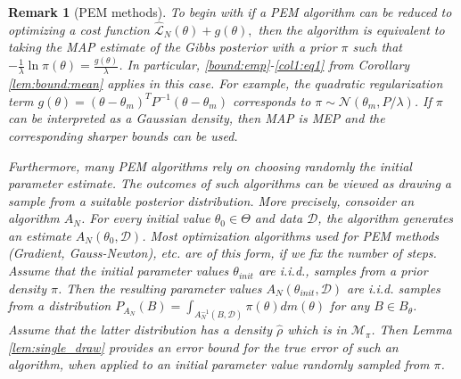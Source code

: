 \documentclass{article}
\newtheorem{remark}[theorem]{Remark}
\begin{document}
  \begin{remark}[PEM methods]
    \label{rem:pem}
    To begin with if a PEM algorithm can be reduced to optimizing a cost function
    \( \hat{\mathcal{L}}_N(\theta)  + g(\theta),\)
    then the algorithm is equivalent to taking the MAP estimate of the Gibbs posterior with a prior $\pi$ such that 
    $-\frac{1}{\lambda}\ln \pi(\theta)=\frac{g(\theta)}{\lambda}$. In particular, \eqref{bound:emp}-\eqref{col1:eq1} from Corollary \ref{lem:bound:mean} applies in this case. For example, the quadratic regularization term $g(\theta)=
    (\theta - \theta_m)^T P^{-1} (\theta - \theta_m) $
    corresponds to $\pi \sim \mathcal{N}(\theta_m, P/\lambda)$. If $\pi$ can be interpreted as a Gaussian density, then MAP is MEP and the corresponding sharper
    bounds can be used. 

    Furthermore, many  PEM algorithms rely on choosing randomly the initial parameter estimate. The outcomes of such algorithms can be viewed as drawing a sample from a suitable posterior distribution. More precisely, consoider an algorithm
    $A_N$. For every initial value $\theta_0 \in \Theta$ and data $\mathcal{D}$, the algorithm
    generates an estimate $A_N(\theta_0,\mathcal{D})$.
    Most optimization algorithms used for PEM methods
    (Gradient, Gauss-Newton), etc. are of this form, if we fix the
    number of steps.
    Assume that the initial parameter values $\theta_{init}$
    are i.i.d., samples from a prior density $\pi$. Then the resulting parameter values
    $A_N(\theta_{init},\mathcal{D})$ are i.i.d. samples from
    a distribution $P_{A_N}(B)=\int_{A_N^{-1}(B,\mathcal{D})} \pi(\theta)dm(\theta)$ for any $B \in B_{\theta}$.
    Assume that the latter distribution has a density
    $\hat{\rho}$ which is in $\mathcal{M}_{\pi}$. 
    Then Lemma \ref{lem:single_draw} provides 
    an error bound for the true error of such an algorithm, when applied to an initial parameter value
    randomly sampled from $\pi$.
  \end{remark}
\end{document}
